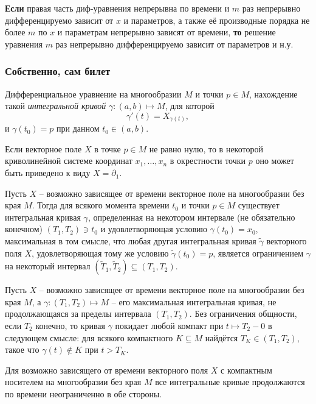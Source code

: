 \begin{to_con} 
    \textbf{Если} правая часть диф-уравнения непрерывна по времени и $m$ раз непрерывно дифференцируемо зависит от $x$ и параметров, а также её производные порядка не более $m$ по $x$ и параметрам непрерывно зависят от времени, \textbf{то} решение уравнения $m$ раз непрерывно дифференцируемо зависит от параметров и н.у.  
\end{to_con}

\subsubsection*{Собственно, сам билет}


\begin{to_def} 
    Дифференциальное уравнение на многообразии $M$ и точки $p \in M$, нахождение такой \textit{интегральной кривой} $\gamma \colon (a, b) \mapsto M$, для которой
    \begin{equation*}
        \gamma'(t) = X_{\gamma(t)},
    \end{equation*}
    и $\gamma(t_0) = p$ при данном $t_0 \in (a, b)$.
\end{to_def}


\begin{to_thr}
     Если векторное поле $X$ в точке $p \in M$ не равно нулю, то в некоторой криволинейной системе координат $x_1, \ldots, x_n$ в окрестности точки $p$ оно может быть приведено к виду $X = \partial_1$. 
\end{to_thr}

\begin{to_lem} 
    Пусть $X$ -- возможно зависящее от времени векторное поле на многообразии без края $M$. Тогда для всякого момента времени $t_0$ и точки $p \in M$ существует интегральная кривая $\gamma$, определенная на некотором интервале (не обязательно конечном) $(T_1, T_2) \ni t_0$ и удовлетворяющая условию $\gamma(t_0) = x_0$, максимальная в том смысле, что любая другая интегральная кривая $\tilde \gamma$ векторного поля $X$, удовлетворяющая тому же условию $\tilde \gamma(t_0) = p$, является ограничением $\gamma$ на некоторый интервал $(\tilde T_1, \tilde T_2) \subseteq (T_1, T_2)$.
\end{to_lem}


\begin{to_thr}
     Пусть $X$ -- возможно зависящее от времени векторное поле на многообразии без края $M$, а $\gamma \colon (T_1, T_2) \mapsto M$ -- его максимальная интегральная кривая, не продолжающаяся за пределы интервала $(T_1, T_2)$. Без ограничения общности, если $T_2$ конечно, то кривая $\gamma$ покидает любой компакт при $t \mapsto T_2 - 0$ в следующем смысле: для всякого компактного $K \subseteq M$ найдётся $T_K \in (T_1, T_2)$, такое что $\gamma(t) \notin K$ при $t > T_K$.
\end{to_thr}

\begin{to_con} 
    Для возможно зависящего от времени векторного поля $X$ с компактным носителем на многообразии без края $M$ все интегральные кривые продолжаются по времени неограниченно в обе стороны. 
\end{to_con}